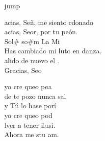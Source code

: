 \begin{cancion}jump\\
	\begin{chorus}%
		acias, Señ, me siento rdonado\\
		acias, Seor, por tu peón.\\
	Sol#     so#m   La       Mi\\
	Has cambiado mi luto en danza.\\
		alido de nuevo el .\\
		Gracias, Seo   \jump\\
	\end{chorus}%
	yo cre queo poa\\
	de te pozo nunca sal \\
	y Tú lo hase porí\\
	\jump
	yo cre queo pod \\
	lver a tener ilusi.\\
	Ahora me stu am.  \\
\end{cancion}%
